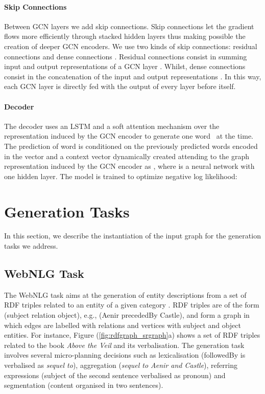 \documentclass[11pt,a4paper,dvipsnames]{article}
\newcommand{\nl}[1]{\textit{{\small #1}}}
\begin{document}
\paragraph{Skip Connections} Between GCN layers we add skip connections.
Skip connections let the gradient flows more efficiently through stacked hidden layers thus making possible the creation of deeper GCN encoders.
We use two kinds of skip connections: residual connections \cite{he2016deep} and dense connections \cite{DBLP:conf/cvpr/HuangLMW17}.
Residual connections consist in summing input and output representations of a GCN layer 
.
Whilst, dense connections consist in the concatenation of the input and output representations .
In this way, each GCN layer is directly fed with the output of every layer before itself.

\vspace*{-0.5ex}
\paragraph{Decoder}
The decoder uses an LSTM and a soft attention mechanism \cite{luong2015effective} over the representation induced by the GCN encoder to generate one word~ at the time.
The prediction of word  is conditioned on the previously predicted words  encoded in the vector  and a context vector 
dynamically created attending to the graph representation induced by the GCN encoder as
,
where  is a neural network with one hidden layer.
The model is trained to optimize negative log likelihood:


\section{Generation Tasks}
\label{sec:d2ttasks}
In this section, we describe the instantiation of the input graph 
for the generation tasks we address.


\subsection{WebNLG Task}
The WebNLG task \cite{gardent-EtAl:2017:Long,gardent-EtAl:2017:INLG2017} 
aims at the generation of entity descriptions from a set of RDF triples 
related to an entity of a given category \cite{perezbeltrachini-sayed-gardent:2016:COLING}. 
RDF triples are of the form ({\sffamily subject relation object}), e.g.,
({\sffamily Aenir precededBy Castle}), and form a graph in which edges are 
labelled with relations and vertices with subject and object entities.
For instance, Figure (\ref{fig:rdfgraph_srgraph}a) shows a set of RDF 
triples related to the book \emph{Above the Veil} and its verbalisation.
The generation task involves several micro-planning decisions such as lexicalisation ({\sffamily followedBy}
is verbalised as \nl{sequel to}), aggregation (\nl{sequel to Aenir and Castle}),
referring expressions (subject of the second sentence verbalised as pronoun)
and segmentation (content organised in two sentences).
\end{document}
